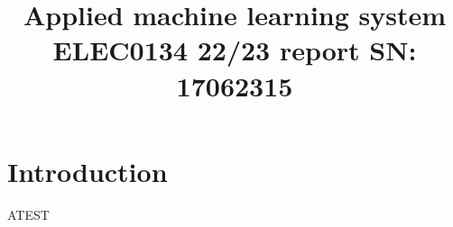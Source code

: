 \documentclass[a4paper,12pt,twoside,twocolumn]{article}
\date{}
\title{Applied machine learning system ELEC0134 22/23 report SN: 17062315}
\begin{document}


\maketitle

\section{Introduction}
\label{sec:org94fe664}

ATEST \cite{latexa}

\printbibliography
\end{document}
